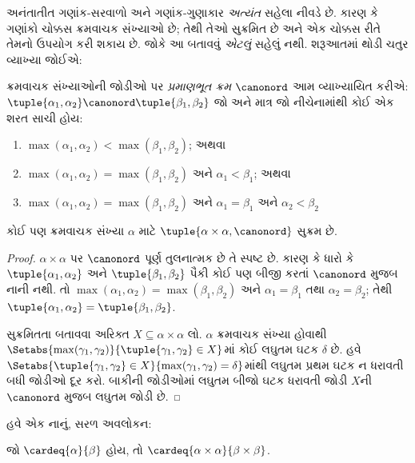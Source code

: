 \documentclass[../../../include/open-logic-section]{subfiles}
\begin{document}


અનંતાતીત ગણાંક-સરવાળો અને ગણાંક-ગુણાકાર
\emph{અત્યંત} સહેલા નીવડે છે. કારણ કે ગણાંકો
ચોક્કસ ક્રમવાચક સંખ્યાઓ છે; તેથી તેઓ સુક્રમિત
છે અને એક ચોક્કસ રીતે તેમનો ઉપયોગ કરી શકાય છે.
જોકે આ બતાવવું \emph{એટલું} સહેલું નથી. શરૂઆતમાં
થોડી ચતુર વ્યાખ્યા જોઈએ:

\begin{defn}
ક્રમવાચક સંખ્યાઓની જોડીઓ પર \emph{પ્રમાણભૂત ક્રમ}
$\canonord$ આમ વ્યાખ્યાયિત કરીએ:
$\tuple{\alpha_1, \alpha_2} \canonord
\tuple{\beta_1, \beta_2}$ જો અને માત્ર જો નીચેનામાંથી
કોઈ એક શરત સાચી હોય:
\begin{enumerate}
	\item $\max(\alpha_1, \alpha_2) < \max(\beta_1, \beta_2)$; અથવા
	\item $\max(\alpha_1, \alpha_2) = \max(\beta_1, \beta_2)$ અને
	$\alpha_1 < \beta_1$; અથવા
	\item $\max(\alpha_1, \alpha_2) = \max(\beta_1, \beta_2)$ અને
	$\alpha_1 = \beta_1$ અને $\alpha_2 < \beta_2$
\end{enumerate}
\end{defn}

\begin{lem}
કોઈ પણ ક્રમવાચક સંખ્યા $\alpha$ માટે
$\tuple{\alpha \times \alpha, \canonord}$ સુક્રમ છે.
\end{lem}

\begin{proof}
$\alpha \times \alpha$ પર $\canonord$ પૂર્ણ તુલનાત્મક છે
તે સ્પષ્ટ છે. કારણ કે ધારો કે
$\tuple{\alpha_1, \alpha_2}$ અને
$\tuple{\beta_1, \beta_2}$ પૈકી કોઈ પણ બીજી કરતાં
$\canonord$ મુજબ નાની નથી. તો
$\max(\alpha_1, \alpha_2) = \max(\beta_1, \beta_2)$
અને $\alpha_1 = \beta_1$ તથા $\alpha_2 = \beta_2$;
તેથી $\tuple{\alpha_1, \alpha_2} =
\tuple{\beta_1,  \beta_2}$.

સુક્રમિતતા બતાવવા અરિક્ત
$X \subseteq \alpha\times\alpha$ લો. $\alpha$
ક્રમવાચક સંખ્યા હોવાથી
$\Setabs{\max(\gamma_1, \gamma_2)}{\tuple{\gamma_1,
\gamma_2} \in X}$માં કોઈ લઘુતમ ઘટક $\delta$ છે.
હવે $\Setabs{\tuple{\gamma_1,\gamma_2} \in X}{\max(\gamma_1, \gamma_2) =
\delta}$માંથી લઘુતમ પ્રથમ ઘટક ન ધરાવતી બધી જોડીઓ
દૂર કરો. બાકીની જોડીઓમાં લઘુતમ બીજો ઘટક ધરાવતી
જોડી $X$ની $\canonord$ મુજબ લઘુતમ જોડી છે.
\end{proof}
\noindent
હવે એક નાનું, સરળ અવલોકન:

\begin{prop}
જો $\cardeq{\alpha}{\beta}$ હોય, તો
$\cardeq{\alpha \times \alpha}{\beta \times \beta}$.
\end{prop}
\end{document}
